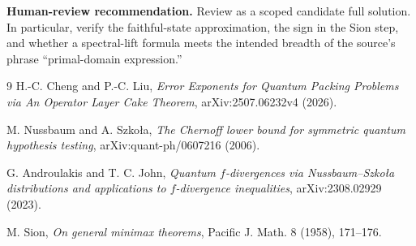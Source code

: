 \documentclass[10pt]{article}
\begin{document}
\textbf{Human-review recommendation.} Review as a scoped candidate full
solution. In particular, verify the faithful-state approximation, the sign in
the Sion step, and whether a spectral-lift formula meets the intended breadth
of the source's phrase ``primal-domain expression.''

\begin{thebibliography}{9}
H.-C. Cheng and P.-C. Liu,
\emph{Error Exponents for Quantum Packing Problems via An Operator Layer Cake
Theorem}, arXiv:2507.06232v4 (2026).

M. Nussbaum and A. Szko\l a,
\emph{The Chernoff lower bound for symmetric quantum hypothesis testing},
arXiv:quant-ph/0607216 (2006).

G. Androulakis and T. C. John,
\emph{Quantum $f$-divergences via Nussbaum--Szko\l a distributions and
applications to $f$-divergence inequalities}, arXiv:2308.02929 (2023).

M. Sion,
\emph{On general minimax theorems}, Pacific J. Math. 8 (1958), 171--176.
\end{thebibliography}
\end{document}
